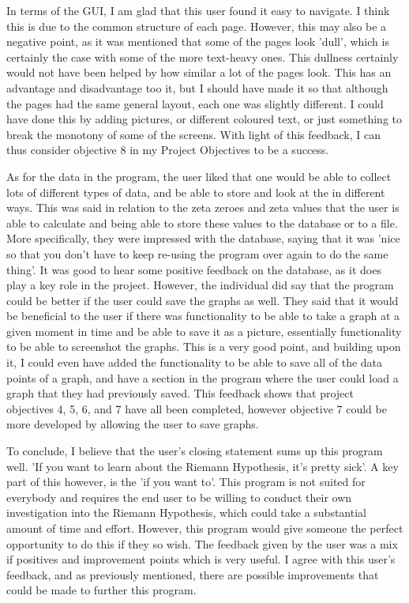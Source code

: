 \documentclass[12pt]{article}
\begin{document}
In terms of the GUI, I am glad that this user found it easy to navigate. I think this is due to the common structure of each page. However, this may also be a negative point, as it was mentioned that some of the pages look 'dull', which is certainly the case with some of the more text-heavy ones. This dullness certainly would not have been helped by how similar a lot of the pages look. This has an advantage and disadvantage too it, but I should have made it so that although the pages had the same general layout, each one was slightly different. I could have done this by adding pictures, or different coloured text, or just something to break the monotony of some of the screens. With light of this feedback, I can thus consider objective 8 in my Project Objectives to be a success.

As for the data in the program, the user liked that one would be able to collect lots of different types of data, and be able to store and look at the in different ways. This was said in relation to the zeta zeroes and zeta values that the user is able to calculate and being able to store these values to the database or to a file.  More specifically, they were impressed with the database, saying that it was 'nice so that you don't have to keep re-using the program over again to do the same thing'. It was good to hear some positive feedback on the database, as it does play a key role in the project. However, the individual did say that the program could be better if the user could save the graphs as well. They said that it would be beneficial to the user if there was functionality to be able to take a graph at a given moment in time and be able to save it as a picture, essentially functionality to be able to screenshot the graphs. This is a very good point, and building upon it, I could even have added the functionality to be able to save all of the data points of a graph, and have a section in the program where the user could load a graph that they had previously saved. This feedback shows that project objectives 4, 5, 6, and 7 have all been completed, however objective 7 could be more developed by allowing the user to save graphs.

To conclude, I believe that the user's closing statement sums up this program well. 'If you want to learn about the Riemann Hypothesis, it's pretty sick'. A key part of this however, is the 'if you want to'. This program is not suited for everybody and requires the end user to be willing to conduct their own investigation into the Riemann Hypothesis, which could take a substantial amount of time and effort. However, this program would give someone the perfect opportunity to do this if they so wish. The feedback given by the user was a mix if positives and improvement points which is very useful. I agree with this user's feedback, and as previously mentioned, there are possible improvements that could be made to further this program.
\end{document}
